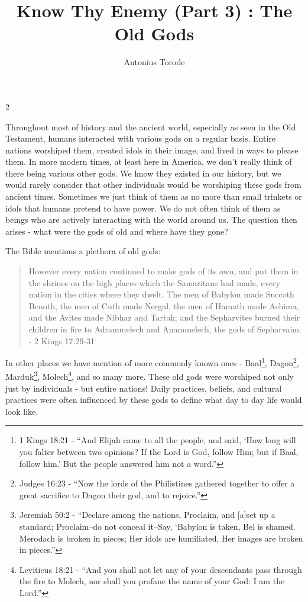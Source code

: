 \documentclass[10pt]{article}
\title{Know Thy Enemy (Part 3) 	: The Old Gods}
\author{Antonius Torode}
\begin{document}
\maketitle
\thispagestyle{fancy}



\begin{multicols}{2}

Throughout most of history and the ancient world, especially as seen in the Old Testament, humans interacted with various gods on a regular basis. Entire nations worshiped them, created idols in their image, and lived in ways to please them. In more modern times, at least here in America, we don't really think of there being various other gods. We know they existed in our history, but we would rarely consider that other individuals would be worshiping these gods from ancient times. Sometimes we just think of them as no more than small trinkets or idols that humans pretend to have power. We do not often think of them as beings who are actively interacting with the world around us. The question then arises - what were the gods of old and where have they gone?

The Bible mentions a plethora of old gods:
\begin{quotation}
However every nation continued to make gods of its own, and put them in the shrines on the high places which the Samaritans had made, every nation in the cities where they dwelt. The men of Babylon made Succoth Benoth, the men of Cuth made Nergal, the men of Hamath made Ashima, and the Avites made Nibhaz and Tartak; and the Sepharvites burned their children in fire to Adrammelech and Anammelech, the gods of Sepharvaim. - 2 Kings 17:29-31
\end{quotation}
In other places we have mention of more commonly known ones - Baal\footnote{1 Kings 18:21 - ``And Elijah came to all the people, and said, `How long will you falter between two opinions? If the Lord is God, follow Him; but if Baal, follow him.' But the people answered him not a word.''}, Dagon\footnote{Judges 16:23 - ``Now the lords of the Philistines gathered together to offer a great sacrifice to Dagon their god, and to rejoice.''}, Marduk\footnote{Jeremiah 50:2 - ``Declare among the nations, Proclaim, and [a]set up a standard; Proclaim--do not conceal it--Say, ‘Babylon is taken, Bel is shamed. Merodach is broken in pieces; Her idols are humiliated, Her images are broken in pieces.''}, Molech\footnote{Leviticus 18:21 - ``And you shall not let any of your descendants pass through the fire to Molech, nor shall you profane the name of your God: I am the Lord.''}, and so many more. These old gods were worshiped not only just by individuals - but entire nations! Daily practices, beliefs, and cultural practices were often influenced by these gods to define what day to day life would look like.


\end{multicols}
\end{document}
